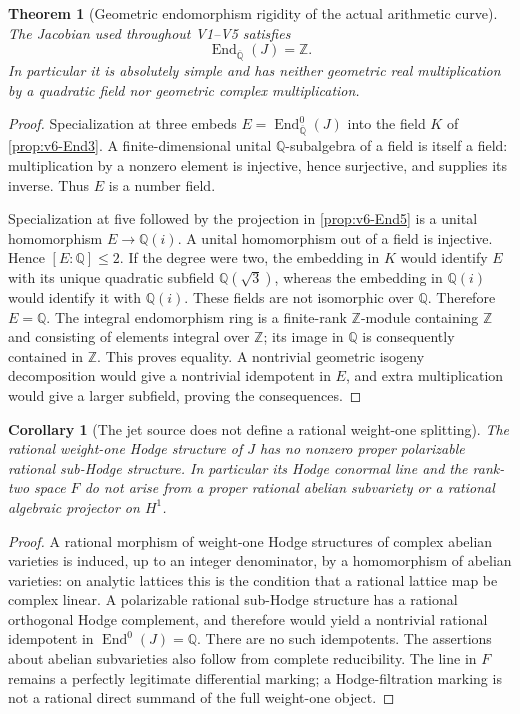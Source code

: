 \documentclass[11pt]{article}
\newtheorem{theorem}{Theorem}[section]
\newtheorem{corollary}[corollary]{Corollary}
\theoremstyle{definition}
\theoremstyle{remark}
\newcommand{\Q}{\mathbb Q}
\newcommand{\Z}{\mathbb Z}
\newcommand{\End}{\operatorname{End}}
\begin{document}
\begin{theorem}[Geometric endomorphism rigidity of the actual arithmetic curve]
\label{thm:v6-EndZ}
The Jacobian used throughout V1--V5 satisfies
\begin{equation}
 \boxed{\End_{\overline{\Q}}(J)=\Z.}
 \label{eq:v6-EndZ}
\end{equation}
In particular it is absolutely simple and has neither geometric real
multiplication by a quadratic field nor geometric complex multiplication.
\end{theorem}
\begin{proof}
Specialization at three embeds
$E=\End^0_{\overline{\Q}}(J)$ into the field $K$ of
\cref{prop:v6-End3}. A finite-dimensional unital $\Q$-subalgebra of a
field is itself a field: multiplication by a nonzero element is injective,
hence surjective, and supplies its inverse. Thus $E$ is a number field.

Specialization at five followed by the projection in
\cref{prop:v6-End5} is a unital homomorphism $E\to\Q(i)$. A unital
homomorphism out of a field is injective. Hence $[E:\Q]\le2$.
If the degree were two, the embedding in $K$ would identify $E$ with
its unique quadratic subfield $\Q(\sqrt3)$, whereas the embedding in
$\Q(i)$ would identify it with $\Q(i)$. These fields are not
isomorphic over $\Q$. Therefore $E=\Q$.
The integral endomorphism ring is a finite-rank $\Z$-module containing
$\Z$ and consisting of elements integral over $\Z$; its image in
$\Q$ is consequently contained in $\Z$. This proves equality.
A nontrivial geometric isogeny decomposition would give a nontrivial
idempotent in $E$, and extra multiplication would give a larger
subfield, proving the consequences.
\end{proof}

\begin{corollary}[The jet source does not define a rational weight-one splitting]
\label{cor:v6-Hodge-nosplit}
The rational weight-one Hodge structure of $J$ has no nonzero proper
polarizable rational sub-Hodge structure. In particular its Hodge
conormal line and the rank-two space $F$ do not arise from a proper
rational abelian subvariety or a rational algebraic projector on $H^1$.
\end{corollary}
\begin{proof}
A rational morphism of weight-one Hodge structures of complex abelian
varieties is induced, up to an integer denominator, by a homomorphism of
abelian varieties: on analytic lattices this is the condition that a
rational lattice map be complex linear. A polarizable rational sub-Hodge
structure has a rational orthogonal Hodge complement, and therefore
would yield a nontrivial rational idempotent in $\End^0(J)=\Q$.
There are no such idempotents. The assertions about abelian subvarieties
also follow from complete reducibility. The line in $F$ remains a
perfectly legitimate differential marking; a Hodge-filtration marking
is not a rational direct summand of the full weight-one object.
\end{proof}
\end{document}
